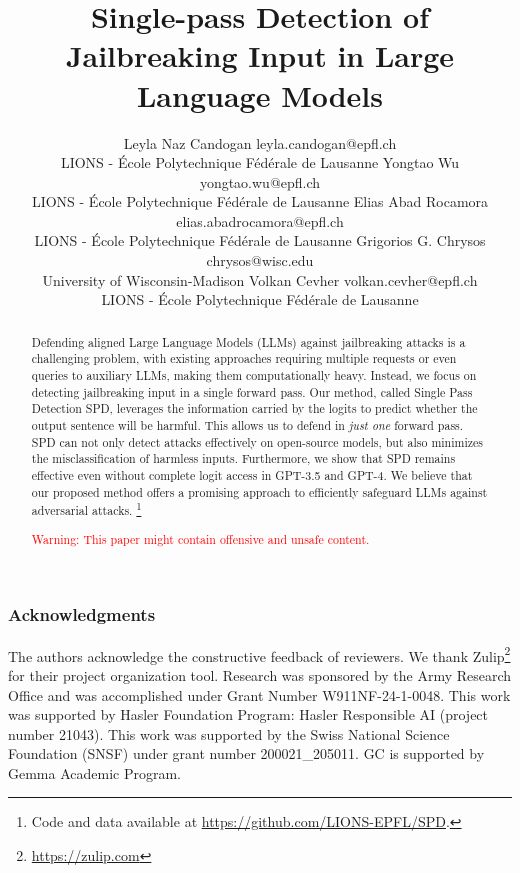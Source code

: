 \documentclass[10pt]{article} %
\title{Single-pass Detection of Jailbreaking Input in Large \\ Language Models}
\author{\name Leyla Naz Candogan \email leyla.candogan@epfl.ch \\
      \addr LIONS - École Polytechnique Fédérale de Lausanne
      \AND
      \name Yongtao Wu \email  yongtao.wu@epfl.ch\\
      \addr LIONS - École Polytechnique Fédérale de Lausanne
      \AND
      \name Elias Abad Rocamora \email elias.abadrocamora@epfl.ch\\
      \addr LIONS - École Polytechnique Fédérale de Lausanne
      \AND
      \name Grigorios G. Chrysos \email  chrysos@wisc.edu\\
      \addr University of Wisconsin-Madison
      \AND
      \name Volkan Cevher \email  volkan.cevher@epfl.ch\\
      \addr LIONS - École Polytechnique Fédérale de Lausanne
      \AND}
\newcommand{\methodname}{{SPD}}
\begin{document}
\maketitle

\begin{abstract}
Defending aligned Large Language Models (LLMs) against jailbreaking attacks is a challenging problem, with existing approaches requiring multiple requests or even queries to auxiliary LLMs, making them computationally heavy. Instead, we focus on detecting jailbreaking input in a single forward pass. Our method, called Single Pass Detection \methodname{}, leverages the information carried by the logits to predict whether the output sentence will be harmful. This allows us to defend in \emph{just one} forward pass. \methodname{} can not only detect attacks effectively on open-source models, but also minimizes the misclassification of harmless inputs. Furthermore, we show that \methodname{} remains effective even without complete logit access in GPT-3.5 and GPT-4. We believe that our proposed method offers a promising approach to efficiently safeguard LLMs against adversarial attacks. \footnote{Code and data available at \url{https://github.com/LIONS-EPFL/SPD}.}

\textcolor{red}{Warning: This paper might contain offensive and unsafe content.}%


\end{abstract}







\newpage

\subsubsection*{Acknowledgments}
The authors acknowledge the constructive feedback of reviewers. We thank Zulip\footnote{\url{https://zulip.com}} for their project organization tool. Research was sponsored by the Army Research Office and was accomplished under Grant Number W911NF-24-1-0048. This work was supported by Hasler Foundation Program: Hasler Responsible AI (project number 21043). This work was supported by the Swiss National Science Foundation (SNSF) under grant number 200021\_205011. GC is supported by Gemma Academic Program. 






\newpage
\appendix


\end{document}
